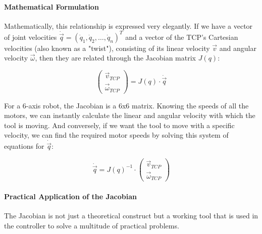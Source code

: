 \paragraph{Mathematical Formulation}
Mathematically, this relationship is expressed very elegantly. If we have a vector of joint velocities $\dot{\vec{q}} = (\dot{q}_1, \dot{q}_2, \dots, \dot{q}_n)^T$ and a vector of the TCP's Cartesian velocities (also known as a "twist"), consisting of its linear velocity $\vec{v}$ and angular velocity $\vec{\omega}$, then they are related through the Jacobian matrix $J(q)$:

$$
\begin{pmatrix} \vec{v}_{TCP} \\ \vec{\omega}_{TCP} \end{pmatrix} = J(q) \cdot \dot{\vec{q}}
$$

\vspace{3pt}
For a 6-axis robot, the Jacobian is a 6x6 matrix. Knowing the speeds of all the motors, we can instantly calculate the linear and angular velocity with which the tool is moving. And conversely, if we want the tool to move with a specific velocity, we can find the required motor speeds by solving this system of equations for $\dot{\vec{q}}$:

$$
\dot{\vec{q}} = J(q)^{-1} \cdot \begin{pmatrix} \vec{v}_{TCP} \\ \vec{\omega}_{TCP} \end{pmatrix}
$$

\paragraph{Practical Application of the Jacobian}
The Jacobian is not just a theoretical construct but a working tool that is used in the controller to solve a multitude of practical problems.

